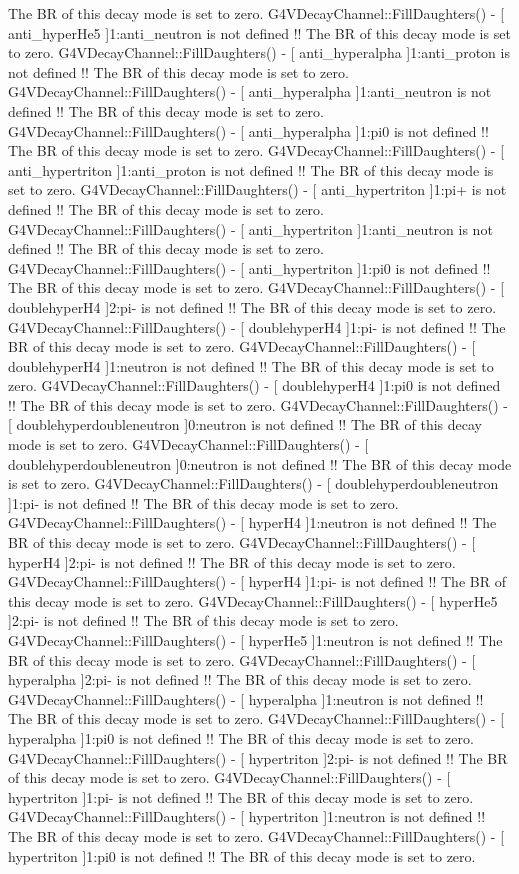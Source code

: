  The BR of this decay mode is set to zero.
G4VDecayChannel::FillDaughters() - [ anti_hyperHe5 ]1:anti_neutron is not defined !!
 The BR of this decay mode is set to zero.
G4VDecayChannel::FillDaughters() - [ anti_hyperalpha ]1:anti_proton is not defined !!
 The BR of this decay mode is set to zero.
G4VDecayChannel::FillDaughters() - [ anti_hyperalpha ]1:anti_neutron is not defined !!
 The BR of this decay mode is set to zero.
G4VDecayChannel::FillDaughters() - [ anti_hyperalpha ]1:pi0 is not defined !!
 The BR of this decay mode is set to zero.
G4VDecayChannel::FillDaughters() - [ anti_hypertriton ]1:anti_proton is not defined !!
 The BR of this decay mode is set to zero.
G4VDecayChannel::FillDaughters() - [ anti_hypertriton ]1:pi+ is not defined !!
 The BR of this decay mode is set to zero.
G4VDecayChannel::FillDaughters() - [ anti_hypertriton ]1:anti_neutron is not defined !!
 The BR of this decay mode is set to zero.
G4VDecayChannel::FillDaughters() - [ anti_hypertriton ]1:pi0 is not defined !!
 The BR of this decay mode is set to zero.
G4VDecayChannel::FillDaughters() - [ doublehyperH4 ]2:pi- is not defined !!
 The BR of this decay mode is set to zero.
G4VDecayChannel::FillDaughters() - [ doublehyperH4 ]1:pi- is not defined !!
 The BR of this decay mode is set to zero.
G4VDecayChannel::FillDaughters() - [ doublehyperH4 ]1:neutron is not defined !!
 The BR of this decay mode is set to zero.
G4VDecayChannel::FillDaughters() - [ doublehyperH4 ]1:pi0 is not defined !!
 The BR of this decay mode is set to zero.
G4VDecayChannel::FillDaughters() - [ doublehyperdoubleneutron ]0:neutron is not defined !!
 The BR of this decay mode is set to zero.
G4VDecayChannel::FillDaughters() - [ doublehyperdoubleneutron ]0:neutron is not defined !!
 The BR of this decay mode is set to zero.
G4VDecayChannel::FillDaughters() - [ doublehyperdoubleneutron ]1:pi- is not defined !!
 The BR of this decay mode is set to zero.
G4VDecayChannel::FillDaughters() - [ hyperH4 ]1:neutron is not defined !!
 The BR of this decay mode is set to zero.
G4VDecayChannel::FillDaughters() - [ hyperH4 ]2:pi- is not defined !!
 The BR of this decay mode is set to zero.
G4VDecayChannel::FillDaughters() - [ hyperH4 ]1:pi- is not defined !!
 The BR of this decay mode is set to zero.
G4VDecayChannel::FillDaughters() - [ hyperHe5 ]2:pi- is not defined !!
 The BR of this decay mode is set to zero.
G4VDecayChannel::FillDaughters() - [ hyperHe5 ]1:neutron is not defined !!
 The BR of this decay mode is set to zero.
G4VDecayChannel::FillDaughters() - [ hyperalpha ]2:pi- is not defined !!
 The BR of this decay mode is set to zero.
G4VDecayChannel::FillDaughters() - [ hyperalpha ]1:neutron is not defined !!
 The BR of this decay mode is set to zero.
G4VDecayChannel::FillDaughters() - [ hyperalpha ]1:pi0 is not defined !!
 The BR of this decay mode is set to zero.
G4VDecayChannel::FillDaughters() - [ hypertriton ]2:pi- is not defined !!
 The BR of this decay mode is set to zero.
G4VDecayChannel::FillDaughters() - [ hypertriton ]1:pi- is not defined !!
 The BR of this decay mode is set to zero.
G4VDecayChannel::FillDaughters() - [ hypertriton ]1:neutron is not defined !!
 The BR of this decay mode is set to zero.
G4VDecayChannel::FillDaughters() - [ hypertriton ]1:pi0 is not defined !!
 The BR of this decay mode is set to zero.

